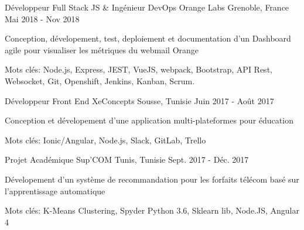

\begin{cventries}

  \cventry
    {Développeur Full Stack JS  \& Ingénieur DevOps} %
    {Orange Labs} %
    {Grenoble, France} %
    {Mai 2018 - Nov 2018} %
    {
      \begin{cvitems} %
        \item {Conception, dévelopement, test, deploiement et documentation d'un Dashboard agile pour visualiser les métriques du webmail Orange}
        \item {Mots clés: Node.js, Express, JEST, VueJS, webpack, Bootstrap, API Rest, Websocket, Git, Openshift, Jenkins, Kanban, Scrum.}
      \end{cvitems}
    }

  \cventry
    {Développeur Front End} %
    {XeConcepts} %
    {Sousse, Tunisie} %
    {Juin 2017 - Août 2017} %
    {
      \begin{cvitems} %
        \item {Conception et dévelopement d'une application multi-plateformes pour éducation}
        \item {Mots clés: Ionic/Angular, Node.js, Slack, GitLab, Trello}
      \end{cvitems}
    }

  \cventry
    {Projet Académique} %
    {Sup'COM} %
    {Tunis, Tunisie} %
    {Sept. 2017 - Déc. 2017} %
    {
      \begin{cvitems} %
        \item {Dévelopement d'un système de recommandation pour les forfaits télécom basé sur l'apprentissage automatique }
        \item {Mots clés: K-Means Clustering, Spyder Python 3.6, Sklearn lib, Node.JS, Angular 4}
      \end{cvitems}
    }


\end{cventries}
